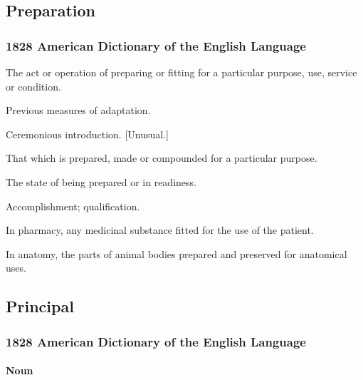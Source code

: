 	\subsection{Preparation} %
		\label{PREPARATION}
		
		\subsubsection{1828 American Dictionary of the English Language}
		
			\begin{compactitem}
				\item[1] The act or operation of preparing or fitting for a particular purpose, use, service or condition.
				\item[2] Previous measures of adaptation.
				\item[3] Ceremonious introduction. [Unusual.]
				\item[4] That which is prepared, made or compounded for a particular purpose.
				\item[5] The state of being prepared or in readiness.
				\item[6] Accomplishment; qualification.
				\item[7] In pharmacy, any medicinal substance fitted for the use of the patient.
				\item[8] In anatomy, the parts of animal bodies prepared and preserved for anatomical uses.
			\end{compactitem}
			
	\subsection{Principal} %
		\label{PRINCIPAL}
		
		\subsubsection{1828 American Dictionary of the English Language}
		
			\paragraph{Noun}
		
